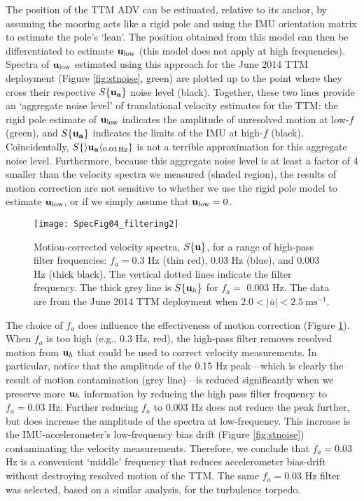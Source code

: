 The position of the TTM ADV can be estimated, relative to its anchor, by assuming the mooring acts like a rigid pole and using the IMU orientation matrix to estimate the pole's `lean'. The position obtained from this model can then be differentiated to estimate $\mathbf{u}_\mathrm{low}$ (this model does not apply at high frequencies). Spectra of $\mathbf{u}_\mathrm{low}$ estimated using this approach for the June 2014 TTM deployment (Figure \ref{fig:stnoise}, green) are plotted up to the point where they cross their respective $S\{\mathbf{u}_\mathbf{a}\}$ noise level (black).  Together, these two lines provide an `aggregate noise level' of translational velocity estimates for the TTM: the rigid pole estimate of $\mathbf{u}_\mathrm{low}$ indicates the amplitude of unresolved motion at low-$f$ (green), and $S\{\mathbf{u}_\mathbf{a}\}$ indicates the limits of the IMU at high-$f$ (black). Coincidentally, $S\{\rangle\mathbf{u}_\mathbf{a}\langle_{0.03\,\mathrm{Hz}}\}$ is not a terrible approximation for this aggregate noise level. Furthermore, because this aggregate noise level is at least a factor of 4 smaller than the velocity spectra we measured (shaded region), the results of motion correction are not sensitive to whether we use the rigid pole model to estimate $\mathbf{u}_\mathrm{low}$, or if we simply assume that $\mathbf{u}_\mathrm{low} = 0$. 

\begin{figure}[t]
  \centering
  \texttt{[image: SpecFig04\_filtering2]}
  \caption{Motion-corrected velocity spectra, $S\{\mathbf{u}\}$, for a range of high-pass filter frequencies: $f_a= 0.3$ Hz (thin red), 0.03 Hz (blue), and 0.003 Hz (thick black). The vertical dotted lines indicate the filter frequency. The thick grey line is $S\{\mathbf{u}_{h}\}$ for $f_a=$ 0.003 Hz. The data are from the June 2014 TTM deployment when $2.0 < |\bar{u}| < 2.5\ \mathrm{ms^{-1}}$.
}
  \label{fig:filts}
\end{figure}

The choice of $f_a$ does influence the effectiveness of motion correction (Figure \ref{fig:filts}). When $f_a$ is too high (e.g., 0.3  Hz, red), the high-pass filter removes resolved motion from $\mathbf{u}_{h}$ that could be used to correct velocity measurements. In particular, notice that the amplitude of the 0.15 Hz peak---which is clearly the result of motion contamination (grey line)---is reduced significantly when we preserve more $\mathbf{u}_{h}$ information by reducing the high pass filter frequency to $f_a = 0.03$ Hz. Further reducing $f_a$ to $0.003$ Hz does not reduce the peak further, but does increase the amplitude of the spectra at low-frequency. This increase is the IMU-accelerometer's low-frequency bias drift (Figure \ref{fig:stnoise}) contaminating the velocity measurements. Therefore, we conclude that $f_a = 0.03$ Hz is a convenient `middle' frequency that reduces accelerometer bias-drift without destroying resolved motion of the TTM.  The same $f_a=0.03$ Hz filter was selected, based on a similar analysis, for the turbulence torpedo. 


